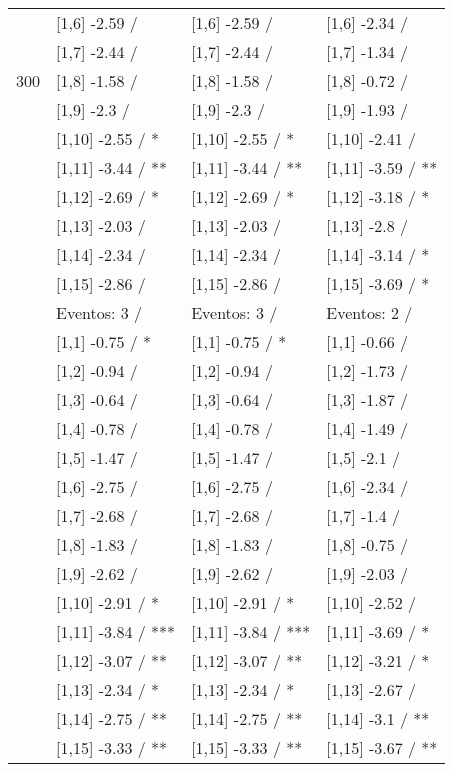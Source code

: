 \begin{table}
\begin{tabular}[t]{llll}
 & {}[1,6] -2.59  / & {}[1,6] -2.59  / & {}[1,6] -2.34  /\\
 & {}[1,7] -2.44  / & {}[1,7] -2.44  / & {}[1,7] -1.34  /\\
300 & {}[1,8] -1.58  / & {}[1,8] -1.58  / & {}[1,8] -0.72  /\\
\addlinespace
 & {}[1,9] -2.3  / & {}[1,9] -2.3  / & {}[1,9] -1.93  /\\
 & {}[1,10] -2.55  / * & {}[1,10] -2.55  / * & {}[1,10] -2.41  /\\
 & {}[1,11] -3.44  / ** & {}[1,11] -3.44  / ** & {}[1,11] -3.59  / **\\
 & {}[1,12] -2.69  / * & {}[1,12] -2.69  / * & {}[1,12] -3.18  / *\\
 & {}[1,13] -2.03  / & {}[1,13] -2.03  / & {}[1,13] -2.8  /\\
\addlinespace
 & {}[1,14] -2.34  / & {}[1,14] -2.34  / & {}[1,14] -3.14  / *\\
 & {}[1,15] -2.86  / & {}[1,15] -2.86  / & {}[1,15] -3.69  / *\\
 & Eventos:  3 / & Eventos:  3 / & Eventos:  2 /\\
 & {}[1,1] -0.75  / * & {}[1,1] -0.75  / * & {}[1,1] -0.66  /\\
 & {}[1,2] -0.94  / & {}[1,2] -0.94  / & {}[1,2] -1.73  /\\
\addlinespace
 & {}[1,3] -0.64  / & {}[1,3] -0.64  / & {}[1,3] -1.87  /\\
 & {}[1,4] -0.78  / & {}[1,4] -0.78  / & {}[1,4] -1.49  /\\
 & {}[1,5] -1.47  / & {}[1,5] -1.47  / & {}[1,5] -2.1  /\\
 & {}[1,6] -2.75  / & {}[1,6] -2.75  / & {}[1,6] -2.34  /\\
 & {}[1,7] -2.68  / & {}[1,7] -2.68  / & {}[1,7] -1.4  /\\
\addlinespace
500 & {}[1,8] -1.83  / & {}[1,8] -1.83  / & {}[1,8] -0.75  /\\
 & {}[1,9] -2.62  / & {}[1,9] -2.62  / & {}[1,9] -2.03  /\\
 & {}[1,10] -2.91  / * & {}[1,10] -2.91  / * & {}[1,10] -2.52  /\\
 & {}[1,11] -3.84  / *** & {}[1,11] -3.84  / *** & {}[1,11] -3.69  / *\\
 & {}[1,12] -3.07  / ** & {}[1,12] -3.07  / ** & {}[1,12] -3.21  / *\\
\addlinespace
 & {}[1,13] -2.34  / * & {}[1,13] -2.34  / * & {}[1,13] -2.67  /\\
 & {}[1,14] -2.75  / ** & {}[1,14] -2.75  / ** & {}[1,14] -3.1  / **\\
 & {}[1,15] -3.33  / ** & {}[1,15] -3.33  / ** & {}[1,15] -3.67  / **\\
\bottomrule
\end{tabular}
\end{table}
